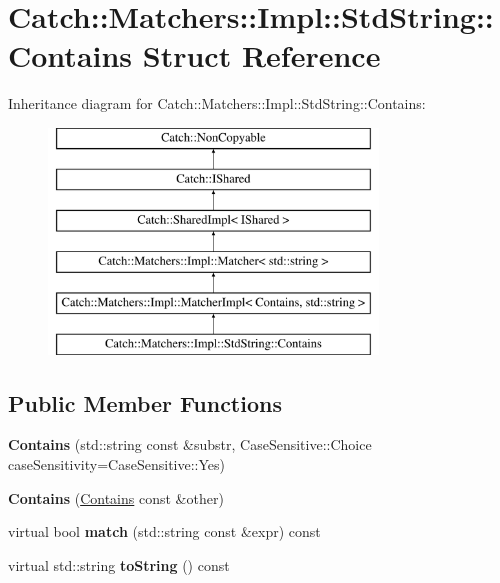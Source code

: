 \hypertarget{structCatch_1_1Matchers_1_1Impl_1_1StdString_1_1Contains}{}\section{Catch\+:\+:Matchers\+:\+:Impl\+:\+:Std\+String\+:\+:Contains Struct Reference}
\label{structCatch_1_1Matchers_1_1Impl_1_1StdString_1_1Contains}
Inheritance diagram for Catch\+:\+:Matchers\+:\+:Impl\+:\+:Std\+String\+:\+:Contains\+:\begin{figure}[H]
\begin{center}
\leavevmode
\includegraphics[height=6.000000cm]{structCatch_1_1Matchers_1_1Impl_1_1StdString_1_1Contains}
\end{center}
\end{figure}
\subsection*{Public Member Functions}
\begin{DoxyCompactItemize}
\item 
\mbox{\label{structCatch_1_1Matchers_1_1Impl_1_1StdString_1_1Contains_a7a062d83bd3e3075929dbb55e1c24258}} 
{\bfseries Contains} (std\+::string const \&substr, Case\+Sensitive\+::\+Choice case\+Sensitivity=Case\+Sensitive\+::\+Yes)
\item 
\mbox{\label{structCatch_1_1Matchers_1_1Impl_1_1StdString_1_1Contains_ad6b1ef653dfcb3bab43c43be043dc4e8}} 
{\bfseries Contains} (\hyperlink{structCatch_1_1Matchers_1_1Impl_1_1StdString_1_1Contains}{Contains} const \&other)
\item 
\mbox{\label{structCatch_1_1Matchers_1_1Impl_1_1StdString_1_1Contains_a2248f3d0d1eb5cf5a1059c183b811a7c}} 
virtual bool {\bfseries match} (std\+::string const \&expr) const
\item 
\mbox{\label{structCatch_1_1Matchers_1_1Impl_1_1StdString_1_1Contains_aed168ddff5bce9295aec5c7daca89849}} 
virtual std\+::string {\bfseries to\+String} () const
\end{DoxyCompactItemize}
